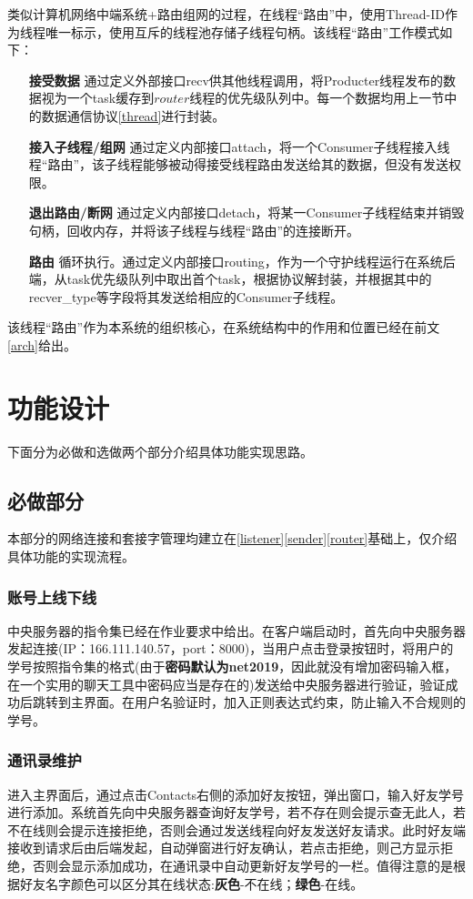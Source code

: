 \documentclass[UTF8]{ctexart}
\begin{document}
类似计算机网络中端系统+路由组网的过程，在线程“路由”中，使用Thread-ID作为线程唯一标示，使用互斥的线程池存储子线程句柄。该线程“路由”工作模式如下：
\begin{itemize}
    \item[\textbf{接受数据}]通过定义外部接口recv供其他线程调用，将Producter线程发布的数据视为一个task缓存到$router$线程的优先级队列中。每一个数据均用上一节中的数据通信协议\ref{thread}进行封装。
    \item[\textbf{接入子线程/组网}]通过定义内部接口attach，将一个Consumer子线程接入线程“路由”，该子线程能够被动得接受线程路由发送给其的数据，但没有发送权限。
    \item[\textbf{退出路由/断网}]通过定义内部接口detach，将某一Consumer子线程结束并销毁句柄，回收内存，并将该子线程与线程“路由”的连接断开。
    \item[\textbf{路由}]循环执行。通过定义内部接口routing，作为一个守护线程运行在系统后端，从task优先级队列中取出首个task，根据协议解封装，并根据其中的recver\_type等字段将其发送给相应的Consumer子线程。
\end{itemize}

该线程“路由”作为本系统的组织核心，在系统结构中的作用和位置已经在前文\ref{arch}给出。


\section{功能设计}
下面分为必做和选做两个部分介绍具体功能实现思路。

\subsection{必做部分}
本部分的网络连接和套接字管理均建立在\ref{listener}\ref{sender}\ref{router}基础上，仅介绍具体功能的实现流程。
\subsubsection{账号上线下线}
中央服务器的指令集已经在作业要求中给出。在客户端启动时，首先向中央服务器发起连接(IP：166.111.140.57，port：8000)，当用户点击登录按钮时，将用户的学号按照指令集的格式(由于\textbf{密码默认为net2019}，因此就没有增加密码输入框，在一个实用的聊天工具中密码应当是存在的)发送给中央服务器进行验证，验证成功后跳转到主界面。在用户名验证时，加入正则表达式约束，防止输入不合规则的学号。
\subsubsection{通讯录维护}
进入主界面后，通过点击Contacts右侧的添加好友按钮，弹出窗口，输入好友学号进行添加。系统首先向中央服务器查询好友学号，若不存在则会提示查无此人，若不在线则会提示连接拒绝，否则会通过发送线程向好友发送好友请求。此时好友端接收到请求后由后端发起，自动弹窗进行好友确认，若点击拒绝，则己方显示拒绝，否则会显示添加成功，在通讯录中自动更新好友学号的一栏。值得注意的是根据好友名字颜色可以区分其在线状态:\textbf{灰色}-不在线；\textbf{绿色}-在线。
\end{document}
